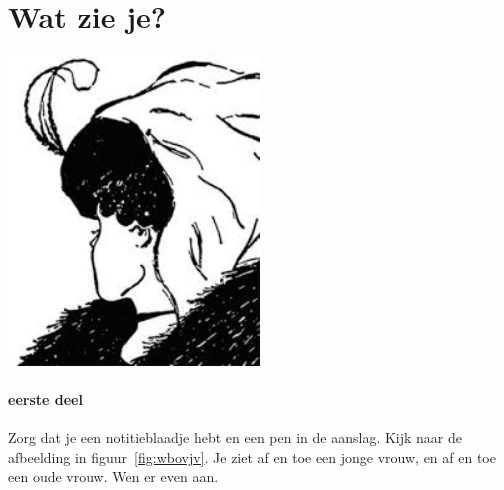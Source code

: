 \documentclass[../../main.tex]{subfiles}
\begin{document}
\onlyinsubfile{
\setcounter{chapter}{0}
}
\notinsubfile{}
\section{Wat zie je?}\label{sec:wbOVJV}

\begin{center}
\leavevmode\includegraphics[width=0.5\textwidth]{./img/ovjv.png}
\end{center}

\paragraph{eerste deel}Zorg dat je een notitieblaadje hebt en een pen in de aanslag. Kijk naar de afbeelding in figuur~\ref{fig:wbovjv}. Je ziet af en toe een jonge vrouw, en af en toe een oude vrouw. Wen er even aan. 
%
\end{document}
